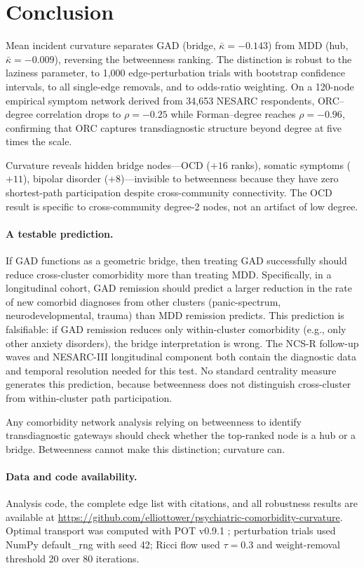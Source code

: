 \documentclass{article}
\begin{document}
\section{Conclusion}

Mean incident curvature separates GAD (bridge, $\bar\kappa = -0.143$) from MDD (hub, $\bar\kappa = -0.009$), reversing the betweenness ranking. The distinction is robust to the laziness parameter, to 1{,}000 edge-perturbation trials with bootstrap confidence intervals, to all single-edge removals, and to odds-ratio weighting. On a 120-node empirical symptom network derived from 34{,}653 NESARC respondents, ORC--degree correlation drops to $\rho = -0.25$ while Forman--degree reaches $\rho = -0.96$, confirming that ORC captures transdiagnostic structure beyond degree at five times the scale.

Curvature reveals hidden bridge nodes---OCD ($+16$ ranks), somatic symptoms ($+11$), bipolar disorder ($+8$)---invisible to betweenness because they have zero shortest-path participation despite cross-community connectivity. The OCD result is specific to cross-community degree-2 nodes, not an artifact of low degree.

\paragraph{A testable prediction.} If GAD functions as a geometric bridge, then treating GAD successfully should reduce cross-cluster comorbidity more than treating MDD. Specifically, in a longitudinal cohort, GAD remission should predict a larger reduction in the rate of new comorbid diagnoses from other clusters (panic-spectrum, neurodevelopmental, trauma) than MDD remission predicts. This prediction is falsifiable: if GAD remission reduces only within-cluster comorbidity (e.g., only other anxiety disorders), the bridge interpretation is wrong. The NCS-R follow-up waves and NESARC-III longitudinal component both contain the diagnostic data and temporal resolution needed for this test. No standard centrality measure generates this prediction, because betweenness does not distinguish cross-cluster from within-cluster path participation.

Any comorbidity network analysis relying on betweenness to identify transdiagnostic gateways should check whether the top-ranked node is a hub or a bridge. Betweenness cannot make this distinction; curvature can.

\paragraph{Data and code availability.} Analysis code, the complete edge list with citations, and all robustness results are available at \url{https://github.com/elliottower/psychiatric-comorbidity-curvature}. Optimal transport was computed with POT v0.9.1 \citep{flamary2021pot}; perturbation trials used NumPy default\_rng with seed 42; Ricci flow used $\tau = 0.3$ and weight-removal threshold 20 over 80 iterations.
\end{document}

